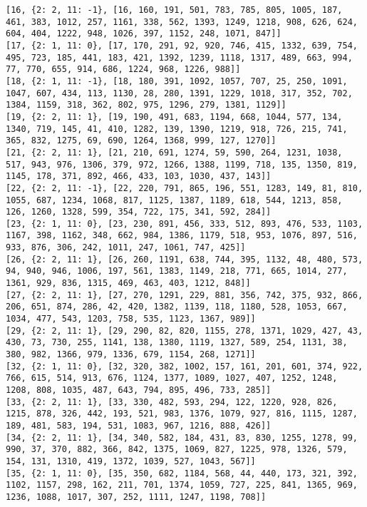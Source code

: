 \documentclass{article}
\begin{document}
\begin{verbatim}
[16, {2: 2, 11: -1}, [16, 160, 191, 501, 783, 785, 805, 1005, 187, 461, 383, 1012, 257, 1161, 338, 562, 1393, 1249, 1218, 908, 626, 624, 604, 404, 1222, 948, 1026, 397, 1152, 248, 1071, 847]]
[17, {2: 1, 11: 0}, [17, 170, 291, 92, 920, 746, 415, 1332, 639, 754, 495, 723, 185, 441, 183, 421, 1392, 1239, 1118, 1317, 489, 663, 994, 77, 770, 655, 914, 686, 1224, 968, 1226, 988]]
[18, {2: 1, 11: -1}, [18, 180, 391, 1092, 1057, 707, 25, 250, 1091, 1047, 607, 434, 113, 1130, 28, 280, 1391, 1229, 1018, 317, 352, 702, 1384, 1159, 318, 362, 802, 975, 1296, 279, 1381, 1129]]
[19, {2: 2, 11: 1}, [19, 190, 491, 683, 1194, 668, 1044, 577, 134, 1340, 719, 145, 41, 410, 1282, 139, 1390, 1219, 918, 726, 215, 741, 365, 832, 1275, 69, 690, 1264, 1368, 999, 127, 1270]]
[21, {2: 2, 11: 1}, [21, 210, 691, 1274, 59, 590, 264, 1231, 1038, 517, 943, 976, 1306, 379, 972, 1266, 1388, 1199, 718, 135, 1350, 819, 1145, 178, 371, 892, 466, 433, 103, 1030, 437, 143]]
[22, {2: 2, 11: -1}, [22, 220, 791, 865, 196, 551, 1283, 149, 81, 810, 1055, 687, 1234, 1068, 817, 1125, 1387, 1189, 618, 544, 1213, 858, 126, 1260, 1328, 599, 354, 722, 175, 341, 592, 284]]
[23, {2: 1, 11: 0}, [23, 230, 891, 456, 333, 512, 893, 476, 533, 1103, 1167, 398, 1162, 348, 662, 984, 1386, 1179, 518, 953, 1076, 897, 516, 933, 876, 306, 242, 1011, 247, 1061, 747, 425]]
[26, {2: 2, 11: 1}, [26, 260, 1191, 638, 744, 395, 1132, 48, 480, 573, 94, 940, 946, 1006, 197, 561, 1383, 1149, 218, 771, 665, 1014, 277, 1361, 929, 836, 1315, 469, 463, 403, 1212, 848]]
[27, {2: 2, 11: 1}, [27, 270, 1291, 229, 881, 356, 742, 375, 932, 866, 206, 651, 874, 286, 42, 420, 1382, 1139, 118, 1180, 528, 1053, 667, 1034, 477, 543, 1203, 758, 535, 1123, 1367, 989]]
[29, {2: 2, 11: 1}, [29, 290, 82, 820, 1155, 278, 1371, 1029, 427, 43, 430, 73, 730, 255, 1141, 138, 1380, 1119, 1327, 589, 254, 1131, 38, 380, 982, 1366, 979, 1336, 679, 1154, 268, 1271]]
[32, {2: 1, 11: 0}, [32, 320, 382, 1002, 157, 161, 201, 601, 374, 922, 766, 615, 514, 913, 676, 1124, 1377, 1089, 1027, 407, 1252, 1248, 1208, 808, 1035, 487, 643, 794, 895, 496, 733, 285]]
[33, {2: 2, 11: 1}, [33, 330, 482, 593, 294, 122, 1220, 928, 826, 1215, 878, 326, 442, 193, 521, 983, 1376, 1079, 927, 816, 1115, 1287, 189, 481, 583, 194, 531, 1083, 967, 1216, 888, 426]]
[34, {2: 2, 11: 1}, [34, 340, 582, 184, 431, 83, 830, 1255, 1278, 99, 990, 37, 370, 882, 366, 842, 1375, 1069, 827, 1225, 978, 1326, 579, 154, 131, 1310, 419, 1372, 1039, 527, 1043, 567]]
[35, {2: 1, 11: 0}, [35, 350, 682, 1184, 568, 44, 440, 173, 321, 392, 1102, 1157, 298, 162, 211, 701, 1374, 1059, 727, 225, 841, 1365, 969, 1236, 1088, 1017, 307, 252, 1111, 1247, 1198, 708]]

\end{verbatim}
\end{document}
